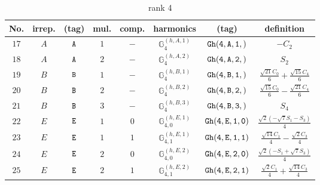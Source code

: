 \documentclass[fleqn,8pt]{jsarticle}
\begin{document}
\begin{table}[ht!]
\begin{center}
\caption{rank 4}
\renewcommand{\arraystretch}{1.3}
\begin{tabular}{cccccccc} \hline \hline
No. & irrep. & (tag) & mul. & comp. & harmonics & (tag) & definition \\ \hline
$ 17 $ & $ A $ & $ {\tt A} $ & $ 1 $ & $ - $ & $ \mathbb{G}_{4}^{(h,A,1)} $ & $ {\tt Gh(4,A,1,)} $ & $ - C_{2} $ \\
$ 18 $ & $ A $ & $ {\tt A} $ & $ 2 $ & $ - $ & $ \mathbb{G}_{4}^{(h,A,2)} $ & $ {\tt Gh(4,A,2,)} $ & $ S_{2} $ \\
$ 19 $ & $ B $ & $ {\tt B} $ & $ 1 $ & $ - $ & $ \mathbb{G}_{4}^{(h,B,1)} $ & $ {\tt Gh(4,B,1,)} $ & $ \frac{\sqrt{21} C_{0}}{6} + \frac{\sqrt{15} C_{4}}{6} $ \\
$ 20 $ & $ B $ & $ {\tt B} $ & $ 2 $ & $ - $ & $ \mathbb{G}_{4}^{(h,B,2)} $ & $ {\tt Gh(4,B,2,)} $ & $ \frac{\sqrt{15} C_{0}}{6} - \frac{\sqrt{21} C_{4}}{6} $ \\
$ 21 $ & $ B $ & $ {\tt B} $ & $ 3 $ & $ - $ & $ \mathbb{G}_{4}^{(h,B,3)} $ & $ {\tt Gh(4,B,3,)} $ & $ S_{4} $ \\
$ 22 $ & $ E $ & $ {\tt E} $ & $ 1 $ & $ 0 $ & $ \mathbb{G}_{4,0}^{(h,E,1)} $ & $ {\tt Gh(4,E,1,0)} $ & $ \frac{\sqrt{2} \left(- \sqrt{7} S_{1} - S_{3}\right)}{4} $ \\
$ 23 $ & $ E $ & $ {\tt E} $ & $ 1 $ & $ 1 $ & $ \mathbb{G}_{4,1}^{(h,E,1)} $ & $ {\tt Gh(4,E,1,1)} $ & $ \frac{\sqrt{14} C_{1}}{4} - \frac{\sqrt{2} C_{3}}{4} $ \\
$ 24 $ & $ E $ & $ {\tt E} $ & $ 2 $ & $ 0 $ & $ \mathbb{G}_{4,0}^{(h,E,2)} $ & $ {\tt Gh(4,E,2,0)} $ & $ \frac{\sqrt{2} \left(- S_{1} + \sqrt{7} S_{3}\right)}{4} $ \\
$ 25 $ & $ E $ & $ {\tt E} $ & $ 2 $ & $ 1 $ & $ \mathbb{G}_{4,1}^{(h,E,2)} $ & $ {\tt Gh(4,E,2,1)} $ & $ \frac{\sqrt{2} C_{1}}{4} + \frac{\sqrt{14} C_{3}}{4} $ \\
 \hline \hline
\end{tabular}
\end{center}
\end{table}
\end{document}
